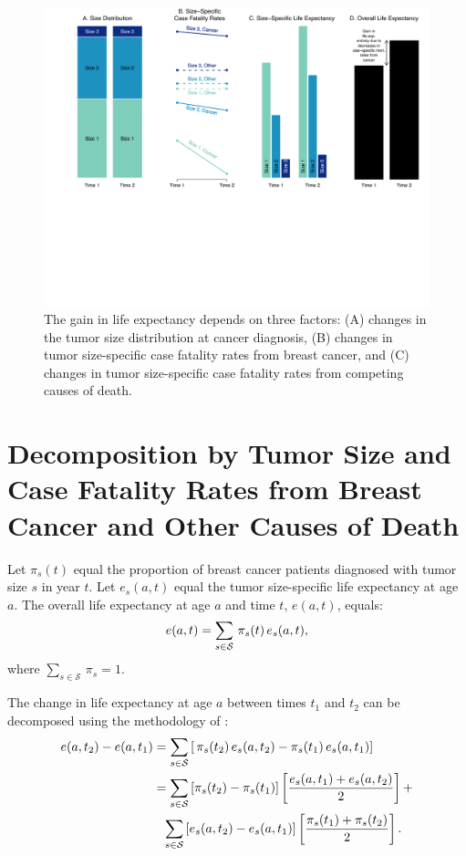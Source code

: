 \documentclass[11pt,letterpaper]{article}
\theoremstyle{plain}
\theoremstyle{remark}
\numberwithin{equation}{section}
\begin{document}
\begin{figure}[h]
\begin{center}
\includegraphics[trim=0 220 0 0,clip,width=\linewidth]{appendix_figure1}
\caption{The gain in life expectancy depends
  on three factors: (A) changes in the tumor size distribution at
  cancer diagnosis, (B) changes in tumor size-specific case fatality rates from
  breast cancer, and (C) changes in tumor size-specific case fatality rates from
  competing causes of death.}
\label{fig:simple_case}
\end{center}
\end{figure}

\section{Decomposition by Tumor Size and Case Fatality Rates from
  Breast Cancer and Other Causes of Death}
Let $\pi_s(t)$ equal the proportion of breast cancer patients
diagnosed with tumor size $s$ in year $t$.  Let $e_s(a,t)$ equal the
tumor size-specific life expectancy at age $a$. The overall life
expectancy at age $a$ and time $t$, $e(a,t)$, equals:
\begin{eqnarray}
  e(a,t)=\sum_{s\in\mathcal{S}}\,\pi_s(t)\,e_s(a,t), \notag
\end{eqnarray}
where $\sum_{s\in\mathcal{S}}\,\pi_s=1$. 

The change in life expectancy at age $a$ between times $t_1$ and $t_2$
can be decomposed using the methodology of \cite{Kitagawa55}:
\begin{align}
  e(a,t_2)-e(a,t_1)&=\sum_{s\in\mathcal{S}}\left[\,\pi_s(t_2)\,e_s(a,t_2)- \pi_s(t_1)\,e_s(a,t_1)\right]  \notag\\
  \hspace{-0.7in} &=\sum_{s\in\mathcal{S}}\left[\pi_s(t_2)-\pi_s(t_1)
  \right]\left[\frac{e_s(a,t_1)+e_s(a,t_2)}{2}\right]+ \notag\\
  &\phantom{=}\sum_{s\in\mathcal{S}}\left[e_s(a,t_2)-e_s(a,t_1)
  \right]\left[\frac{\pi_s(t_1)+\pi_s(t_2)}{2}\right].
 \label{eqn:decomp.basic}
\end{align}
 
\end{document}
